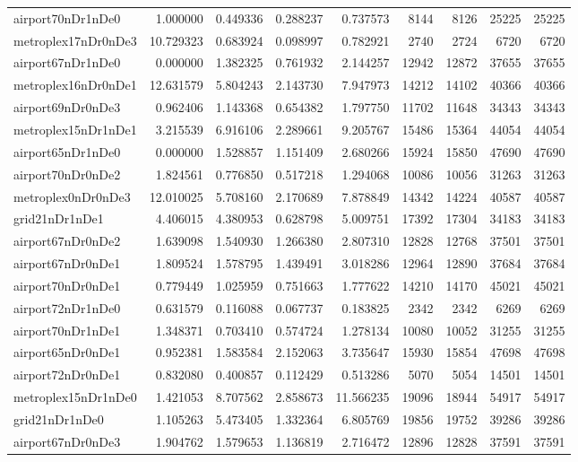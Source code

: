 \begin{longtable}{|l|r|r|r|r|r|r|r|r|}
airport70nDr1nDe0 & 1.000000 & 0.449336 & 0.288237 & 0.737573 & 8144 & 8126 & 25225 & 25225 \\
metroplex17nDr0nDe3 & 10.729323 & 0.683924 & 0.098997 & 0.782921 & 2740 & 2724 & 6720 & 6720 \\
airport67nDr1nDe0 & 0.000000 & 1.382325 & 0.761932 & 2.144257 & 12942 & 12872 & 37655 & 37655 \\
metroplex16nDr0nDe1 & 12.631579 & 5.804243 & 2.143730 & 7.947973 & 14212 & 14102 & 40366 & 40366 \\
airport69nDr0nDe3 & 0.962406 & 1.143368 & 0.654382 & 1.797750 & 11702 & 11648 & 34343 & 34343 \\
metroplex15nDr1nDe1 & 3.215539 & 6.916106 & 2.289661 & 9.205767 & 15486 & 15364 & 44054 & 44054 \\
airport65nDr1nDe0 & 0.000000 & 1.528857 & 1.151409 & 2.680266 & 15924 & 15850 & 47690 & 47690 \\
airport70nDr0nDe2 & 1.824561 & 0.776850 & 0.517218 & 1.294068 & 10086 & 10056 & 31263 & 31263 \\
metroplex0nDr0nDe3 & 12.010025 & 5.708160 & 2.170689 & 7.878849 & 14342 & 14224 & 40587 & 40587 \\
grid21nDr1nDe1 & 4.406015 & 4.380953 & 0.628798 & 5.009751 & 17392 & 17304 & 34183 & 34183 \\
airport67nDr0nDe2 & 1.639098 & 1.540930 & 1.266380 & 2.807310 & 12828 & 12768 & 37501 & 37501 \\
airport67nDr0nDe1 & 1.809524 & 1.578795 & 1.439491 & 3.018286 & 12964 & 12890 & 37684 & 37684 \\
airport70nDr0nDe1 & 0.779449 & 1.025959 & 0.751663 & 1.777622 & 14210 & 14170 & 45021 & 45021 \\
airport72nDr1nDe0 & 0.631579 & 0.116088 & 0.067737 & 0.183825 & 2342 & 2342 & 6269 & 6269 \\
airport70nDr1nDe1 & 1.348371 & 0.703410 & 0.574724 & 1.278134 & 10080 & 10052 & 31255 & 31255 \\
airport65nDr0nDe1 & 0.952381 & 1.583584 & 2.152063 & 3.735647 & 15930 & 15854 & 47698 & 47698 \\
airport72nDr0nDe1 & 0.832080 & 0.400857 & 0.112429 & 0.513286 & 5070 & 5054 & 14501 & 14501 \\
metroplex15nDr1nDe0 & 1.421053 & 8.707562 & 2.858673 & 11.566235 & 19096 & 18944 & 54917 & 54917 \\
grid21nDr1nDe0 & 1.105263 & 5.473405 & 1.332364 & 6.805769 & 19856 & 19752 & 39286 & 39286 \\
airport67nDr0nDe3 & 1.904762 & 1.579653 & 1.136819 & 2.716472 & 12896 & 12828 & 37591 & 37591 \\

\end{longtable}
